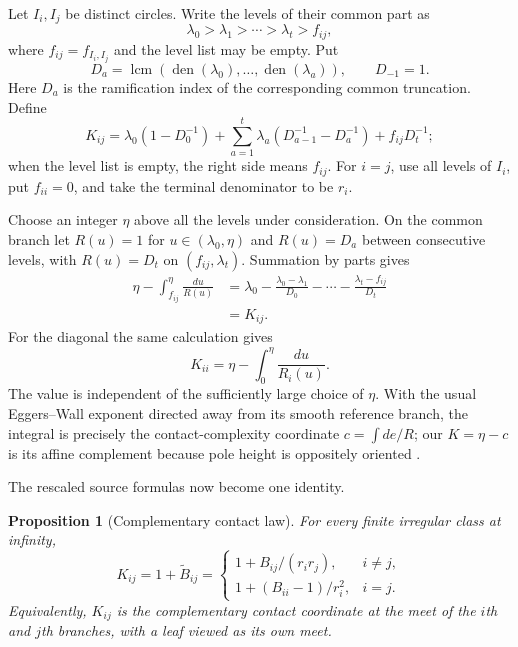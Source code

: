 \documentclass[11pt,a4paper]{amsart}
\theoremstyle{plain}
\newtheorem{proposition}[theorem]{Proposition}
\theoremstyle{definition}
\newcommand{\lcm}{\operatorname{lcm}}
\newcommand{\den}{\operatorname{den}}
\begin{document}
Let $I_i,I_j$ be distinct circles.  Write the levels of their common part as
\[
 \lambda_0>\lambda_1>\cdots>\lambda_t>f_{ij},
\]
where $f_{ij}=f_{I_i,I_j}$ and the level list may be empty.  Put
\[
 D_a=\lcm(\den(\lambda_0),\ldots,\den(\lambda_a)),\qquad D_{-1}=1.
\]
Here $D_a$ is the ramification index of the corresponding common truncation.  Define
\begin{equation}\label{eq:contact-pair-sum}
 K_{ij}=\lambda_0(1-D_0^{-1})+
 \sum_{a=1}^t\lambda_a(D_{a-1}^{-1}-D_a^{-1})+f_{ij}D_t^{-1};
\end{equation}
when the level list is empty, the right side means $f_{ij}$.  For $i=j$, use all levels of $I_i$,
put $f_{ii}=0$, and take the terminal denominator to be $r_i$.

Choose an integer $\eta$ above all the levels under consideration.  On the common branch let
$R(u)=1$ for $u\in(\lambda_0,\eta)$ and $R(u)=D_a$ between consecutive levels, with
$R(u)=D_t$ on $(f_{ij},\lambda_t)$.  Summation by parts gives
\begin{equation}\label{eq:contact-integral}
\begin{aligned}
 \eta-\int_{f_{ij}}^\eta\frac{du}{R(u)}
 &=\lambda_0-\frac{\lambda_0-\lambda_1}{D_0}-\cdots
   -\frac{\lambda_t-f_{ij}}{D_t}\\
 &=K_{ij}.
\end{aligned}
\end{equation}
For the diagonal the same calculation gives
\begin{equation}\label{eq:contact-diagonal-integral}
 K_{ii}=\eta-\int_0^\eta\frac{du}{R_i(u)}.
\end{equation}
The value is independent of the sufficiently large choice of $\eta$.  With the usual
Eggers--Wall exponent directed away from its smooth reference branch, the integral is precisely
the contact-complexity coordinate $c=\int de/R$; our $K=\eta-c$ is its affine complement because
pole height is oppositely oriented \cite[Definition~3.15 and Theorem~3.25]
{GarciaBarrosoGonzalezPopescu2019}.

The rescaled source formulas now become one identity.

\begin{proposition}[Complementary contact law]\label{prop:contact-law}
For every finite irregular class at infinity,
\begin{equation}\label{eq:contact-B-law}
 K_{ij}=1+\widetilde B_{ij}
 =\begin{cases}
  1+B_{ij}/(r_ir_j),&i\ne j,\\
  1+(B_{ii}-1)/r_i^2,&i=j.
 \end{cases}
\end{equation}
Equivalently, $K_{ij}$ is the complementary contact coordinate at the meet of the $i$th and
$j$th branches, with a leaf viewed as its own meet.
\end{proposition}
\end{document}
